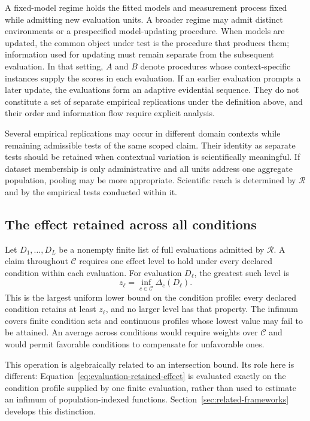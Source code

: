 \documentclass[11pt]{article}
\newcommand{\Regime}{\mathcal{R}}
\newcommand{\CSet}{\mathcal{C}}
\theoremstyle{remark}
\begin{document}
A fixed-model regime holds the fitted models and measurement process fixed while admitting new evaluation units. A broader regime may admit distinct environments or a prespecified model-updating procedure. When models are updated, the common object under test is the procedure that produces them; information used for updating must remain separate from the subsequent evaluation. In that setting, $A$ and $B$ denote procedures whose context-specific instances supply the scores in each evaluation. If an earlier evaluation prompts a later update, the evaluations form an adaptive evidential sequence. They do not constitute a set of separate empirical replications under the definition above, and their order and information flow require explicit analysis.

Several empirical replications may occur in different domain contexts while remaining admissible tests of the same scoped claim. Their identity as separate tests should be retained when contextual variation is scientifically meaningful. If dataset membership is only administrative and all units address one aggregate population, pooling may be more appropriate. Scientific reach is determined by $\Regime$ and by the empirical tests conducted within it.

\subsection{The effect retained across all conditions}

Let $D_1,\ldots,D_L$ be a nonempty finite list of full evaluations admitted by $\Regime$. A claim throughout $\CSet$ requires one effect level to hold under every declared condition within each evaluation. For evaluation $D_\ell$, the greatest such level is
\begin{equation}
z_\ell
=
\inf_{c\in\CSet}\Delta_c(D_\ell).
\label{eq:evaluation-retained-effect}
\end{equation}
This is the largest uniform lower bound on the condition profile: every declared condition retains at least $z_\ell$, and no larger level has that property. The infimum covers finite condition sets and continuous profiles whose lowest value may fail to be attained. An average across conditions would require weights over $\CSet$ and would permit favorable conditions to compensate for unfavorable ones.

This operation is algebraically related to an intersection bound. Its role here
is different: Equation~\eqref{eq:evaluation-retained-effect} is evaluated
exactly on the condition profile supplied by one finite evaluation, rather than
used to estimate an infimum of population-indexed functions. Section~\ref{sec:related-frameworks}
develops this distinction.
\end{document}
